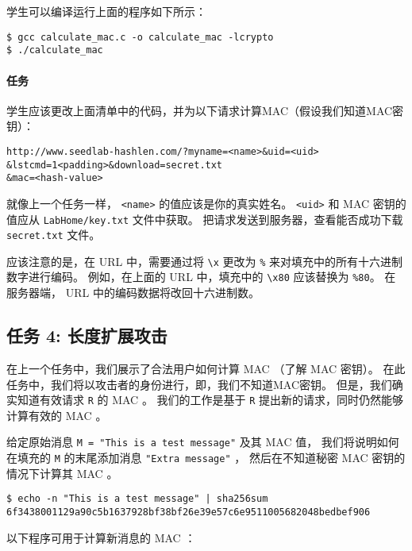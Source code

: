 学生可以编译运行上面的程序如下所示：

\begin{lstlisting}
$ gcc calculate_mac.c -o calculate_mac -lcrypto
$ ./calculate_mac
\end{lstlisting}


\paragraph{任务}
学生应该更改上面清单中的代码，并为以下请求计算MAC（假设我们知道MAC密钥）：

\begin{lstlisting}
http://www.seedlab-hashlen.com/?myname=<name>&uid=<uid>
&lstcmd=1<padding>&download=secret.txt
&mac=<hash-value>
\end{lstlisting}

就像上一个任务一样， \texttt{<name>} 的值应该是你的真实姓名。
\texttt{<uid>} 和 MAC 密钥的值应从 \texttt{LabHome/key.txt} 文件中获取。
把请求发送到服务器，查看能否成功下载 \texttt{secret.txt} 文件。

应该注意的是，在 URL 中，需要通过将 \texttt{\textbackslash x} 更改为 \texttt{\%}
来对填充中的所有十六进制数字进行编码。
例如，在上面的 URL 中，填充中的 \texttt{\textbackslash x80} 应该替换为 \texttt{\%80}。
在服务器端， URL 中的编码数据将改回十六进制数。


\subsection{任务 4: 长度扩展攻击}

在上一个任务中，我们展示了合法用户如何计算 MAC （了解 MAC 密钥）。
在此任务中，我们将以攻击者的身份进行，即，我们不知道MAC密钥。
但是，我们确实知道有效请求 \texttt{R} 的 MAC 。
我们的工作是基于 \texttt{R} 提出新的请求，同时仍然能够计算有效的 MAC 。

给定原始消息 \texttt{M = "This is a test message"} 及其 MAC 值，
我们将说明如何在填充的 \texttt{M} 的末尾添加消息 \texttt{"Extra message"} ，
然后在不知道秘密 MAC 密钥的情况下计算其 MAC 。

\begin{lstlisting}
$ echo -n "This is a test message" | sha256sum
6f3438001129a90c5b1637928bf38bf26e39e57c6e9511005682048bedbef906
\end{lstlisting}

以下程序可用于计算新消息的 MAC ：


